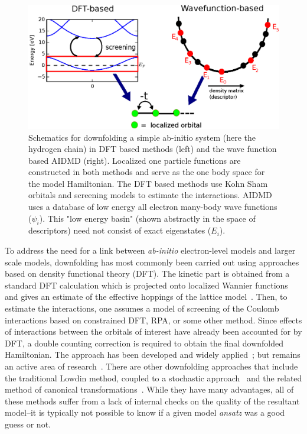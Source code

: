 \begin{figure}
\centering
\includegraphics[width=1\linewidth]{./Figures/figure1.eps}
\caption{Schematics for downfolding a simple ab-initio system (here the hydrogen chain) in DFT based methods (left) and the wave function based AIDMD (right). 
Localized one particle functions are constructed in both methods and serve as the one body space for the model Hamiltonian. 
The DFT based methods use Kohn Sham orbitals and screening models to estimate the interactions. 
AIDMD uses a database of low energy all electron many-body wave functions ($\psi_i$). 
This "low energy basin" (shown abstractly in the space of descriptors) need not consist of exact eigenstates ($E_i$).}
\label{fig:lowenergybasin_schematic}
\end{figure}	


To address the need for a link between {\it ab-initio} electron-level  models and larger scale models, downfolding has most commonly been carried out using approaches based on density functional theory (DFT). 
The kinetic part is obtained from a standard DFT calculation which is projected onto localized Wannier functions and gives an estimate of the effective hoppings of the lattice model~\cite{Pavirini}. 
Then, to estimate the interactions, one assumes a model of screening of the Coulomb interactions based on constrained DFT, RPA, or some other method. 
Since effects of interactions between the orbitals of interest have already been accounted for by DFT, a double counting correction is required to obtain the final downfolded Hamiltonian. 
The approach has been developed and widely applied~\cite{}; but remains an active area of research~\cite{Haule_doublecounting}.
There are other downfolding approaches that include the traditional Lowdin method, coupled to a stochastic approach~\cite{Tenno,Zhou_Ceperley} and the related method of canonical transformations~\cite{White_CT, Yanai_CT}. 
While they have many advantages, all of these methods suffer from a lack of internal checks on the quality of the resultant model--it is typically not possible to know if a given model {\it ansatz} was a good guess or not.   

